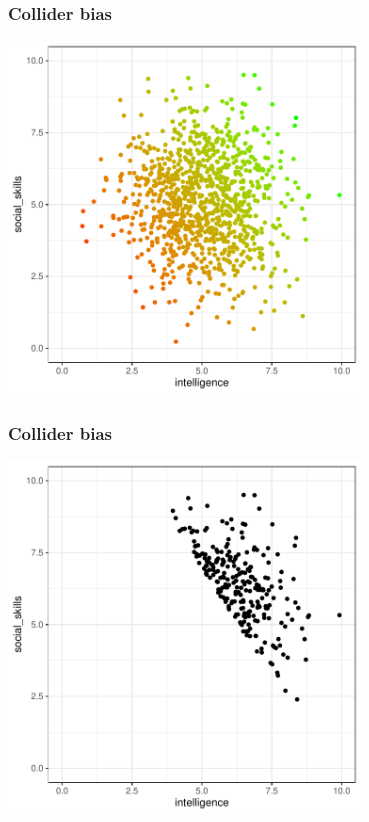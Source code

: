\documentclass[aspectratio=43]{beamer}
\begin{document}
\begin{frame}
\frametitle{Collider bias}
\centering

\includegraphics[width = 0.7\textwidth]{../img/collider3}

\end{frame}

\begin{frame}
\frametitle{Collider bias}
\centering

\includegraphics[width = 0.7\textwidth]{../img/collider4}

\end{frame}
\end{document}
